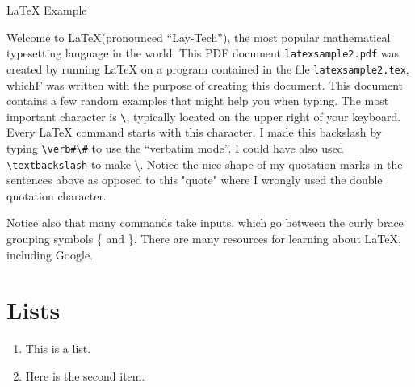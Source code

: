 \documentclass{article}  %
\begin{document}
  


\pagestyle{empty}
\centerline{\Large LaTeX Example}

\bigskip

Welcome to \LaTeX (pronounced ``Lay-Tech''), the most popular mathematical typesetting language in the world.                         This PDF document \texttt{latexsample2.pdf} was created by running \LaTeX{} on a program contained in the file \texttt{latexsample2.tex}, whichF
was written with                                  the purpose of creating this document.  
This document contains a few random examples that might help you when                                       typing.  
The most important character is \verb#\#, typically located on the upper right of your keyboard.  Every \LaTeX{} command starts with this character.  I made this backslash by typing \verb^\verb#\#^ to use the ``verbatim mode''.  
 I could have also used \verb#\textbackslash# to make \textbackslash.  
 Notice the nice shape of my quotation marks in the  sentences above as opposed to this "quote" where I wrongly used the double quotation character.




Notice also that many commands take inputs, which go between the curly brace grouping symbols \{ and \}.  There are many  resources for learning about \LaTeX, including Google.

\section{Lists}

\begin{enumerate}  %
\item This is a list.




\item Here is the second item.
\end{enumerate}
\end{document}
